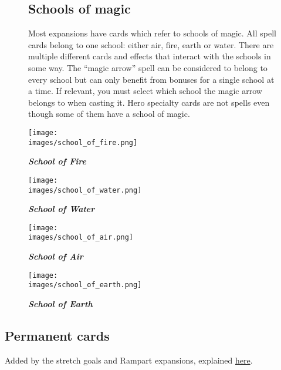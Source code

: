 
\begin{figure}[h]
  \begin{minipage}[t]{0.48\textwidth}
    \vspace{0pt}
    \subsection*{Schools of magic}
    Most expansions have cards which refer to schools of magic.
    All spell cards belong to one school: either air, fire, earth or water.
    There are multiple different cards and effects that interact with the schools in some way.
    The “magic arrow” spell can be considered to belong to every school but can only benefit from bonuses for a single school at a time.
    If relevant, you must select which school the magic arrow belongs to when casting it.
    Hero specialty cards are not spells even though some of them have a school of magic.
  \end{minipage}
  \begin{minipage}[t]{0.48\textwidth}
    \vspace{0pt}
    \centering
      \centering
      \texttt{[image: \\images/school\_of\_fire.png]}
      \caption{{\textit{\textbf{\textcolor{darkcandyapplered}{School of Fire}}}}}
    \endminipage
      \centering
      \texttt{[image: \\images/school\_of\_water.png]}
      \caption{{\textit{\textbf{\textcolor{darkcandyapplered}{School of Water}}}}}
    \endminipage
    \hfill\allowbreak%
    \bigbreak
      \centering
      \texttt{[image: \\images/school\_of\_air.png]}
      \caption{{\textit{\textbf{\textcolor{darkcandyapplered}{School of Air}}}}}
    \endminipage
      \centering
      \texttt{[image: \\images/school\_of\_earth.png]}
      \caption{{\textit{\textbf{\textcolor{darkcandyapplered}{School of Earth}}}}}
    \endminipage
  \end{minipage}
\end{figure}

\subsection*{Permanent cards}
Added by the stretch goals and Rampart expansions, explained \hyperlink{Playerdecks}{here}.

